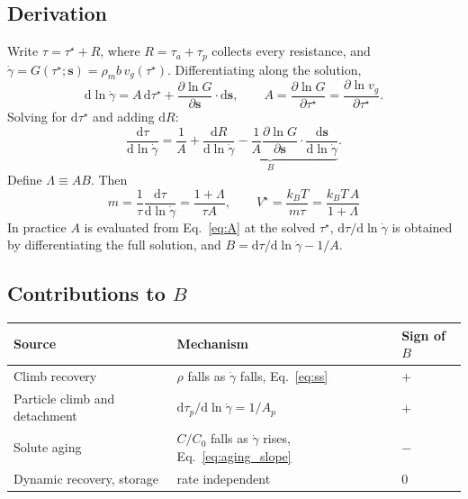 \documentclass[11pt]{article}
\newcommand{\gd}{\dot\gamma}
\newcommand{\ts}{\tau^{\star}}
\newcommand{\kT}{k_BT}
\newcommand{\dd}{\mathrm{d}}
\numberwithin{equation}{section}
\begin{document}
\subsection{Derivation}
Write $\tau=\ts+R$, where $R=\tau_a+\tau_p$ collects every resistance, and $\gd=G(\ts;\bm s)=\rho_mb\,v_g(\ts)$. Differentiating along the solution,
\begin{equation}
\dd\ln\gd=A\,\dd\ts+\frac{\partial\ln G}{\partial\bm s}\cdot\dd\bm s,\qquad A=\frac{\partial\ln G}{\partial\ts}=\frac{\partial\ln v_g}{\partial\ts}.
\end{equation}
Solving for $\dd\ts$ and adding $\dd R$:
\begin{equation}
\frac{\dd\tau}{\dd\ln\gd}=\frac1A+\underbrace{\frac{\dd R}{\dd\ln\gd}-\frac1A\frac{\partial\ln G}{\partial\bm s}\cdot\frac{\dd\bm s}{\dd\ln\gd}}_{\displaystyle B}.
\end{equation}
Define $\Lambda\equiv AB$. Then
\begin{equation}
\boxed{\;m=\frac{1}{\tau}\frac{\dd\tau}{\dd\ln\gd}=\frac{1+\Lambda}{\tau A},\qquad
V^\star=\frac{\kT}{m\tau}=\frac{\kT\,A}{1+\Lambda}\;}
\label{eq:srs}
\end{equation}
In practice $A$ is evaluated from Eq.~\eqref{eq:A} at the solved $\ts$, $\dd\tau/\dd\ln\gd$ is obtained by differentiating the full solution, and $B=\dd\tau/\dd\ln\gd-1/A$.

\subsection{Contributions to $B$}
\begin{center}
\begin{tabular}{lll}
\toprule
Source & Mechanism & Sign of $B$\\
\midrule
Climb recovery & $\rho$ falls as $\gd$ falls, Eq.~\eqref{eq:ss} & $+$\\
Particle climb and detachment & $\dd\tau_p/\dd\ln\gd=1/A_p$ & $+$\\
Solute aging & $C/C_0$ falls as $\gd$ rises, Eq.~\eqref{eq:aging_slope} & $-$\\
Dynamic recovery, storage & rate independent & $0$\\
\bottomrule
\end{tabular}
\end{center}
\end{document}

